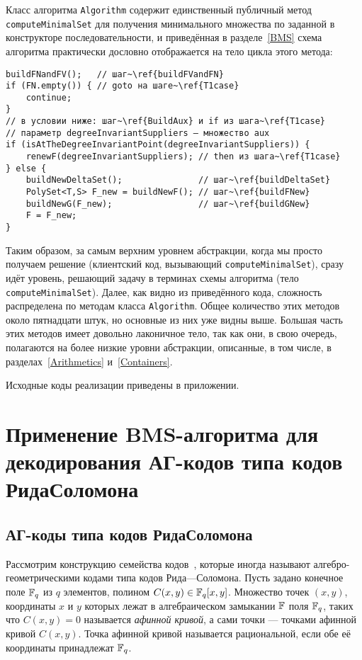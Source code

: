 \documentclass[14pt]{extarticle}
\begin{document}
Класс алгоритма \texttt{Algorithm} содержит единственный публичный метод
\texttt{computeMinimalSet} для получения минимального множества по заданной в
конструкторе последовательности, и приведённая в разделе~\ref{BMS} схема
алгоритма практически дословно отображается на тело цикла этого метода:
\begin{lstlisting}[basicstyle=\small,texcl]
buildFNandFV();   // шаг~\ref{buildFVandFN}
if (FN.empty()) { // goto на шаге~\ref{T1case}
    continue;
}
// в условии ниже: шаг~\ref{BuildAux} и if из шага~\ref{T1case}
// параметр degreeInvariantSuppliers — множество aux
if (isAtTheDegreeInvariantPoint(degreeInvariantSuppliers)) {
    renewF(degreeInvariantSuppliers); // then из шага~\ref{T1case}
} else {
    buildNewDeltaSet();               // шаг~\ref{buildDeltaSet}
    PolySet<T,S> F_new = buildNewF(); // шаг~\ref{buildFNew}
    buildNewG(F_new);                 // шаг~\ref{buildGNew}
    F = F_new;
}
\end{lstlisting}
Таким образом, за самым верхним уровнем абстракции, когда мы просто получаем
решение (клиентский код, вызывающий \texttt{computeMinimalSet}), сразу идёт
уровень, решающий задачу в терминах схемы алгоритма (тело
\texttt{computeMinimalSet}). Далее, как видно из приведённого кода, сложность
распределена по методам класса \texttt{Algorithm}. Общее количество этих методов
около пятнадцати штук, но основные из них уже видны выше. Большая часть этих
методов имеет довольно лаконичное тело, так как они, в свою очередь, полагаются
на более низкие уровни абстракции, описанные, в том числе, в
разделах~\ref{Arithmetics} и~\ref{Containers}. 

Исходные коды реализации приведены 
в приложении.

\section{Применение BMS-алгоритма для декодирования 
АГ-кодов типа кодов Ри\-да\emd Со\-ло\-мо\-на}
\subsection{АГ-коды типа кодов Рида\emd Соломона}


Рассмотрим конструкцию семейства кодов~\cite{Justesen92}, которые иногда
называют ал\-геб\-ро-геометрическими кодами типа кодов Ри\-да—Со\-ло\-мо\-на.
Пусть задано конечное поле $\mathbb F_q$ из $q$ элементов, полином
$C(x,y)\in\mathbb F_q[x,y]$. Множество точек $(x,y)$, координаты $x$ и $y$ которых
лежат в алгебраическом замыкании $\mathbb F$ поля $\mathbb F_q$, таких что $C(x,y)=0$
называется \emph{афинной кривой}, а сами точки — точками афинной кривой
$C(x,y)$. Точка афинной кривой называется рациональной, если обе её координаты
принадлежат $\mathbb F_q$. 
\end{document}
